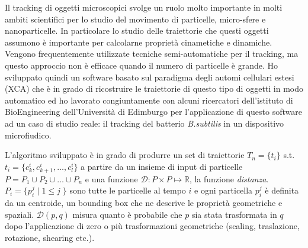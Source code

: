 Il tracking di oggetti microscopici svolge un ruolo molto importante in molti ambiti scientifici per lo studio del movimento di particelle,  micro-sfere   e nanoparticelle. In particolare lo studio delle traiettorie che questi oggetti assumono è importante per calcolarne proprietà cinametiche e dinamiche. Vengono frequentemente utilizzate tecniche semi-automatiche per il tracking, ma questo approccio non è efficace quando il numero di particelle è grande.
Ho sviluppato quindi un software basato sul paradigma degli automi cellulari estesi (XCA) che è in grado di ricostruire le traiettorie di questo tipo di oggetti in modo automatico ed ho lavorato congiuntamente con alcuni ricercatori dell'istituto di BioEngineering dell'Università di Edimburgo per l'applicazione di questo software ad un caso di studio reale: il tracking del batterio \textit{B.subtilis} in un dispositivo microfiudico.

L'algoritmo sviluppato è in grado di produrre un set di traiettorie $ T_n = \{ t_i \}$  s.t.  $t_i=\{ c^i_k,c^i_{k+1},\ldots,c^i_l \} $ a partire da un insieme di input di particelle $P=P_1 \cup P_2 \cup \ldots \cup P_n$ e una funzione $\mathcal{D} :  P \times P \mapsto \mathbb{R}$, 
la funzione  \textit{distanza}.
$P_i = \{p^j_i \; | \; 1 \leq j\; \}$ sono tutte le particelle al tempo $i$ e ogni particella $p_i^j$ è definita da un centroide, un bounding box che ne descrive le proprietà geometriche e spaziali. 
$\mathcal{D}(p,q)$ misura quanto è probabile che  $p$ sia stata trasformata in $q$ dopo l'applicazione di zero o più trasformazioni geometriche (scaling, traslazione, rotazione, shearing etc.). 

